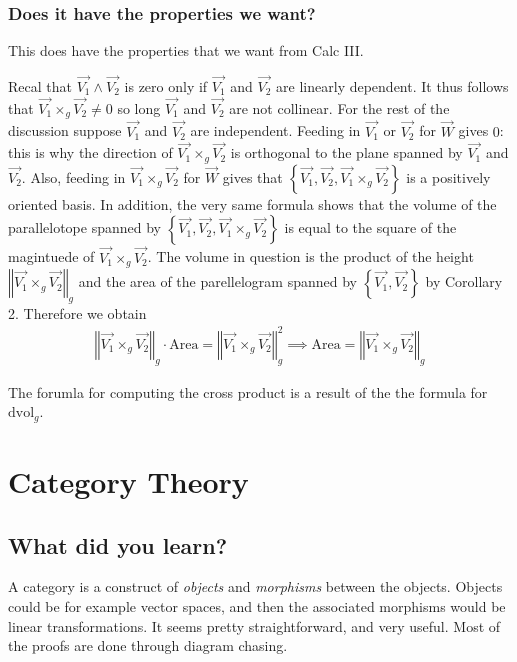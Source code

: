 \documentclass[12pt]{armath}
\newcommand{\aabs}[1]{\left\Vert{#1}\right\Vert}
\newcommand{\dvol}{\text{dvol}_g}
\newcommand{\va}{\vec{V_1}}
\newcommand{\vb}{\vec{V_2}}
\newcommand{\vxv}{\vec{V_1}\times_g\vec{V_2}}
\begin{document}
  \subsubsection{Does it have the properties we want?}%
  \label{ssub:does_it_have_the_properties_we_want_}

  This does have the properties that we want from Calc III.

  Recal that $\vec{V_1}\wedge\vec{V_2}$ is zero only if $\vec{V_1}$ and
  $\vec{V_2}$ are linearly dependent. It thus follows that
  $\vec{V_1}\times_g\vec{V_2}\neq 0$ so long $\vec{V_1}$ and $\vec{V_2}$ are
  not collinear. For the rest of the discussion suppose $\vec{V_1}$ and
  $\vec{V_2}$ are independent. Feeding in $\vec{V_1}$ or $\vec{V_2}$ for
  $\vec{W}$ gives $0$: this is why the direction of
  $\vec{V_1}\times_g\vec{V_2}$ is orthogonal to the plane spanned by
  $\vec{V_1}$ and $\vec{V_2}$. Also, feeding in $\vec{V_1}\times_g\vec{V_2}$
  for $\vec{W}$ gives that $\left\{\va,\vb,\vxv\right\}$ is a positively
  oriented basis. In addition, the very same formula shows that the volume of
  the parallelotope spanned by $\left\{\va,\vb,\vxv\right\}$ is equal to the
  square of the magintuede of $\vxv$. The volume in question is the product of
  the height $\aabs{\vxv}_g$ and the area of the parellelogram spanned by
  $\left\{\va,\vb\right\}$ by Corollary 2. Therefore we obtain
  \begin{align*}
    \aabs{\vxv}_g\cdot\text{Area}=\aabs{\vxv}^2_g\implies\text{Area}=\aabs{\vxv}_g
  \end{align*}

  The forumla for computing the cross product is a result of the the formula
  for $\dvol$.

  \section{Category Theory}%
  \label{sec:category_theory}

  \subsection{What did you learn?}%
  \label{sub:what_did_you_learn_}

  A category is a construct of \textit{objects} and \textit{morphisms} between
  the objects. Objects could be for example vector spaces, and then the
  associated morphisms would be linear transformations. It seems pretty
  straightforward, and very useful. Most of the proofs are done through diagram
  chasing.
\end{document}
